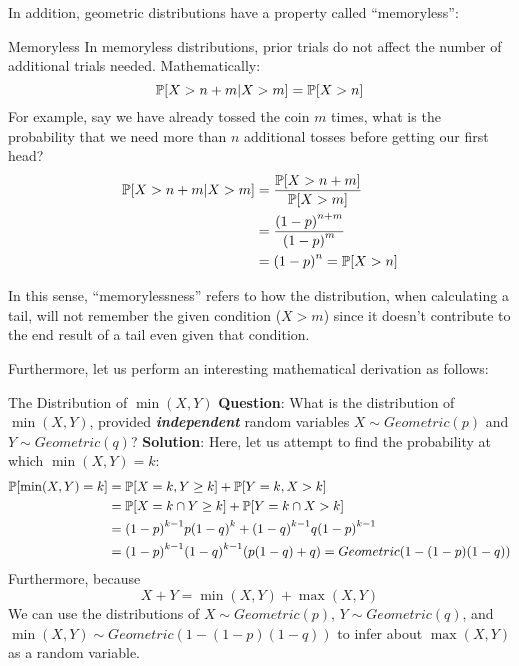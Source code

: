 In addition, geometric distributions have a property called ``memoryless'':
\begin{ln-define}{Memoryless}{}
    In memoryless distributions, prior trials do not affect the number of additional trials needed. Mathematically:
    \[\P[X > n + m | X > m] = \P[X > n]\]
    For example, say we have already tossed the coin $m$ times, what is the probability that we need more than $n$ additional tosses before getting our first head?
    \begin{align*}
        \P[X > n + m | X > m]
        &= \frac{\P[X > n + m]}{\P[X > m]} \\
        &= \frac{{(1 - p)}^{n + m}}{{(1 - p)}^m} \\
        &= {(1 - p)}^n = \P[X > n]
    \end{align*}
\end{ln-define}
In this sense, ``memorylessness'' refers to how the distribution, when calculating a tail, will not remember the given condition ($X > m$) since it doesn't contribute to the end result of a tail even given that condition.

Furthermore, let us perform an interesting mathematical derivation as follows:
\begin{ln-practice}{The Distribution of $\min(X, Y)$}{}
    \textbf{Question}: What is the distribution of $\min(X, Y)$, provided \textit{\textbf{independent}} random variables $X \sim Geometric(p)$ and $Y \sim Geometric(q)$?
    \tcblower
    \textbf{Solution}:
    Here, let us attempt to find the probability at which $\min(X, Y) = k$:
    \begin{align*}
        \P[\min(X, Y) = k]
        &= \P[X = k, Y \geq k] + \P[Y = k, X > k] \\
        &= \P[X = k \cap Y \geq k] + \P[Y = k \cap X > k] \\
        &= {(1 - p)}^{k - 1} p {(1 - q)}^k + {(1 - q)}^{k - 1} q {(1 - p)}^{k - 1} \\
        &= {(1 - p)}^{k - 1}{(1 - q)}^{k - 1} (p(1 - q) + q) = Geometric(1 - (1 - p)(1 - q))
    \end{align*}
    Furthermore, because
    \[X + Y = \min(X, Y) + \max(X, Y)\]
    We can use the distributions of $X \sim Geometric(p)$, $Y \sim Geometric(q)$, and $\min(X, Y) \sim Geometric(1 - (1 - p)(1 - q))$ to infer about $\max(X, Y)$ as a random variable.
\end{ln-practice}

